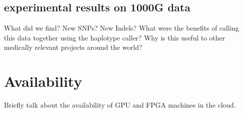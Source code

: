 \documentclass[11pt, oneside]{article}
\begin{document}
	\subsection{experimental results on 1000G data}
	What did we find? New SNPs? New Indels? 
	What were the benefits of calling this data together using the haplotype caller?
	Why is this useful to other medically relevant projects around the world? 

	\section{Availability}
	Briefly talk about the availability of GPU and FPGA machines in the cloud.
\end{document}
